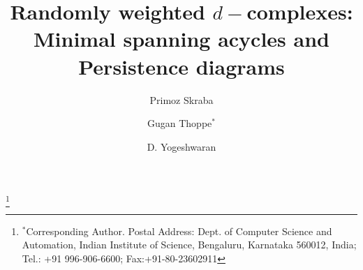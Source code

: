 \documentclass[12pt]{amsart}
\newcommand{\red}[1]{\textcolor{red}{#1}}
\renewcommand{\red}[1]{#1}
\numberwithin{equation}{section}
\numberwithin{theorem}{section}
\newcommand{\1}{\mathbf{1}}
\begin{document}
\title[Random $d-$complexes]{Randomly weighted $d-$complexes: Minimal spanning acycles and Persistence diagrams}%
\author{Primoz Skraba}
\address[PS]{School of Mathematical Sciences, Queen Mary University of London, UK \& Jozef Stefan Institute, Ljubljana, Slovenia. \textnormal{Research supported  by ARRS project N1-0058.}}
%
%

\author{Gugan Thoppe$^*$}
\thanks{$^*$Corresponding Author. Postal Address: Dept. of Computer Science and Automation, Indian Institute of Science, Bengaluru, Karnataka 560012, India; Tel.: +91 996-906-6600; Fax:+91-80-23602911}
\address[GT]{Dept. of Computer Science and Automation, Indian Institute of Science, Bengaluru, India; Past: Faculty of Electrical Engineering, Technion-Israel Institute of Technology, Haifa, Israel. \textnormal{Research supported by URSAT, ERC Grant 320422.}}%

\author{D. Yogeshwaran}
\address[DY]{Statistics and Mathematics Unit, Indian Statistical Institute, Bengaluru, India. \textnormal{Research supported by DST-INSPIRE faculty award.}}

\end{document}
